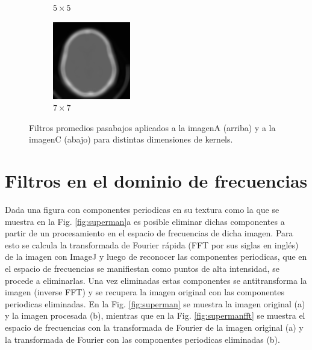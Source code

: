 \documentclass[letterpaper,12pt]{article}
\theoremstyle{plain}
\begin{document}
\begin{figure}[h]
\begin{subfigure}[h]{0.24\linewidth}
            \caption{$5\times5$} 
         \end{subfigure}
         \begin{subfigure}[h]{0.24\linewidth}
            \centering
            \includegraphics[width=\textwidth]{Figuras/ImagenC7x7.png}
            \caption{$7\times7$} 
         \end{subfigure}
    \caption{Filtros promedios pasabajos aplicados a la imagenA (arriba) y a la imagenC (abajo) para distintas dimensiones de kernels.}
    \label{fig:Pasabajo}
\end{figure}


\section{Filtros en el dominio de frecuencias\label{sec:ej5}}

\vspace{0.3cm}

Dada una figura con componentes periodicas en su textura como la que se muestra en la Fig. \ref{fig:superman}a es posible eliminar dichas componentes a partir de un procesamiento en el espacio de frecuencias de dicha imagen. Para esto se calcula la transformada de Fourier rápida (FFT por sus siglas en inglés) de la imagen con ImageJ y luego de reconocer las componentes periodicas, que en el espacio de frecuencias se manifiestan como puntos de alta intensidad, se procede a eliminarlas. Una vez eliminadas estas componentes se antitransforma la imagen (inverse FFT) y se recupera la imagen original con las componentes periodicas eliminadas. En la Fig. \ref{fig:superman} se muestra la imagen original (a) y la imagen procesada (b), mientras que en la Fig. \ref{fig:supermanfft} se muestra el espacio de frecuencias con la transformada de Fourier de la imagen original (a) y la transformada de Fourier con las componentes periodicas eliminadas (b). 
\end{document}
